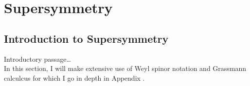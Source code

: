 \documentclass[../main.tex]{subfiles}
\begin{document}
\chapter{Supersymmetry}


\section{Introduction to Supersymmetry}
\label{susy:sec:introduction}

Introductory passage\ldots\\
In this section, I will make extensive use of Weyl spinor notation and Grassmann calculcus for which I go in depth in Appendix \needcite.
\end{document}
